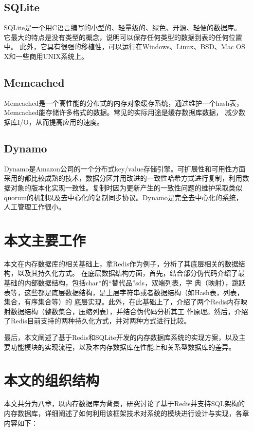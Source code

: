 \documentclass{zjutthesis}
\begin{document}
\subsection{SQLite}
SQLite\cite{web:SQLite}是一个用C语言编写的小型的、轻量级的、绿色、开源、轻便的数据库。
它最大的特点是没有类型的概念，说明可以保存任何类型的数据到表的任何位置中。
此外，它具有很强的移植性，可以运行在Windows、Linux、BSD、Mac OS X和一些商用UNIX系统上。

\subsection{Memcached}
Memcached\cite{fitzpatrick2009memcached}是一个高性能的分布式的内存对象缓存系统\cite{俞华锋2008memcached}，通过维护一个hash表，Memcached能存储许多格式的数据。常见的实际用途是缓存数据库数据，
减少数据库I/O，从而提高应用的速度。

\subsection{Dynamo}
Dynamo\cite{decandia2007dynamo}是Amazon公司的一个分布式key/value存储引擎。可扩展性和可用性方面采用的都比较成熟的技术，数据分区并用改进的一致性哈希方式进行复制，利用数据对象的版本化实现一致性。复制时因为更新产生的一致性问题的维护采取类似quorum的机制以及去中心化的复制同步协议。Dynamo是完全去中心化的系统，人工管理工作很小。

\section{本文主要工作}
本文在内存数据库的相关基础上，拿Redis作为例子，分析了其底层相关的数据结构，以及其持久化方式。
在底层数据结构方面，首先，结合部分伪代码介绍了最基础的内部数据结构，包括char*的“替代品”sds，双端列表，字
典（映射），跳跃表等，这些都是底层数据结构，是上层字符串或者数据结构（如Hash表，列表，集合，有序集合等）的
底层实现。此外，在此基础上了，介绍了两个Redis内存映射数据结构（整数集合，压缩列表），并结合伪代码分析其工
作原理。然后，介绍了Redis目前支持的两种持久化方式，并对两种方式进行比较。

最后，本文阐述了基于Redis和SQLite开发的内存数据库系统的实现方案，以及主要功能模块的实现流程，以及本内存数据库在性能上和关系型数据库的差异。

\section{本文的组织结构}
本文共分为八章，以内存数据库为背景，研究讨论了基于Redis并支持SQL架构的内存数据库，详细阐述了如何利用该框架技术对系统的模块进行设计与实现，各章内容如下：
\end{document}
